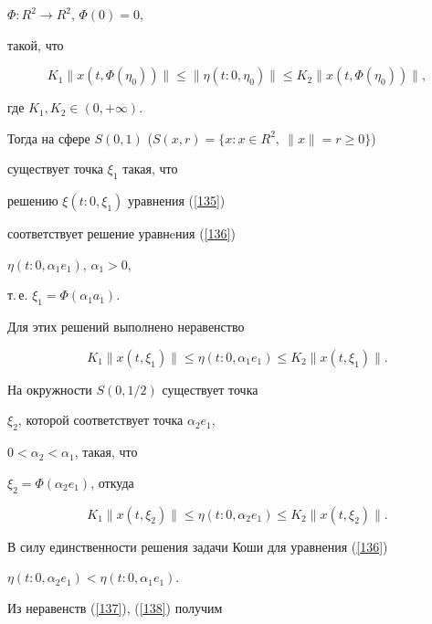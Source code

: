 $\Phi:R^{2}\rightarrow R^{2}$, $\Phi(0)=0$,


такой, что


$$


K_{1}\|x(t,\Phi(\eta_{0}))\|\leq \|\eta(t:0,\eta_{0})\|\leq


K_{2}\|x(t,\Phi(\eta_{0}))\|,


$$


где $K_{1},K_{2}\in(0,+\infty)$.


Тогда на сфере $S(0,1)$ ($S(x,r)=\{x:x\in R^{2},\ \|x\|=r\ge0\}$)


существует точка $\xi_{1}$ такая, что


решению $\xi(t:0,\xi_{1})$ уравнения (\ref{135}) 


соответствует решение уравнeния (\ref{136})


$\eta(t:0,\alpha_{1} e_{1})$, $\alpha_{1}>0$,


т.\,е. $\xi_{1}=\Phi(\alpha_{1}a_{1})$.


Для этих решений выполнено неравенство


\begin{equation}


\label{137}


K_{1}\|x(t,\xi_{1})\|\leq \eta(t:0,\alpha_{1} e_{1})\leq


K_{2}\|x(t,\xi_{1})\|.


\end{equation}





На окружности $S(0,1/2)$ существует точка


$\xi_{2}$, которой соответствует точка $\alpha_{2} e_{1}$,


$0<\alpha_{2}<\alpha_{1}$, такая, что


$\xi_{2}=\Phi(\alpha_{2}e_{1})$, откуда


\begin{equation}


\label{138}


K_{1}\|x(t,\xi_{2})\|\leq \eta(t:0,\alpha_{2} e_{1})\leq


K_{2}\|x(t,\xi_{2})\|.


\end{equation}


В силу единственности решения задачи Коши для уравнения (\ref{136})


$\eta(t:0,\alpha_{2} e_{1}) < \eta(t:0,\alpha_{1} e_{1})$.


Из неравенств (\ref{137}), (\ref{138}) получим


